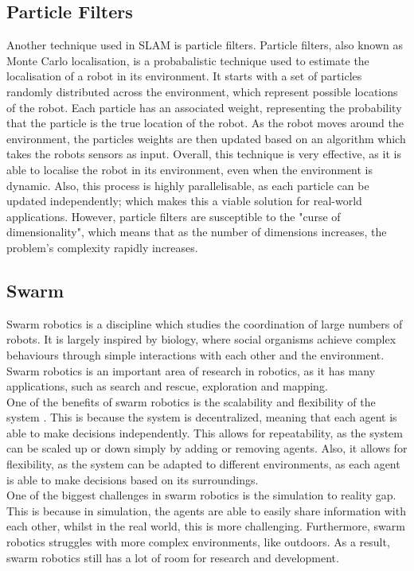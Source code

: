 \documentclass[12pt]{article}
\begin{document}
\subsection{Particle Filters}
Another technique used in SLAM is particle filters. Particle filters, also known as Monte Carlo localisation, is a probabalistic
technique used to estimate the localisation of a robot in its environment. It starts with a set of particles randomly distributed
across the environment, which represent possible locations of the robot. Each particle has an associated weight, representing the
probability that the particle is the true location of the robot. As the robot moves around the environment, the particles weights
are then updated based on an algorithm which takes the robots sensors as input. Overall, this technique is very effective, as it
is able to localise the robot in its environment, even when the environment is dynamic. Also, this process is highly parallelisable,
as each particle can be updated independently; which makes this a viable solution for real-world applications. However, particle
filters are susceptible to the "curse of dimensionality", which means that as the number of dimensions increases, the problem's
complexity rapidly increases.

\subsection{Swarm}
Swarm robotics \cite{intro_to_swarm} is a discipline which studies the coordination of large numbers of robots. It is largely inspired by biology,
where social organisms achieve complex behaviours through simple interactions with each other and the environment. Swarm
robotics is an important area of research in robotics, as it has many applications, such as search and rescue, exploration
and mapping.\\
One of the benefits of swarm robotics is the scalability and flexibility of the system \cite{swarm_SLAM}. This is because the system is
decentralized, meaning that each agent is able to make decisions independently. This allows for repeatability, as the system
can be scaled up or down simply by adding or removing agents. Also, it allows for flexibility, as the system can be adapted
to different environments, as each agent is able to make decisions based on its surroundings.\\
One of the biggest challenges in swarm robotics is the simulation to reality gap. This is because in simulation, the agents
are able to easily share information with each other, whilst in the real world, this is more challenging. Furthermore, swarm
robotics struggles with more complex environments, like outdoors. As a result, swarm robotics still has a lot of room for
research and development.
\end{document}
